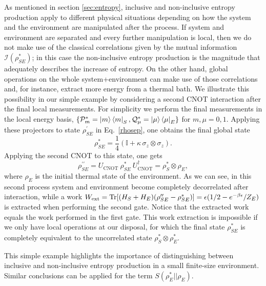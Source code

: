 \documentclass[aps,prx,twocolumn,showpacs,floatfix,superscriptaddress,graphics,longbibliography]{revtex4-1}
\newcommand{\tr}{\mathrm{Tr}}
\begin{document}
As mentioned in section \ref{sec:entropy}, inclusive and non-inclusive entropy production apply to different physical situations depending on how the system and the environment are manipulated after the process. If system and environment are separated and every further manipulation is local, then  we do not make use of the classical correlations given by the mutual information  $\mathcal{I}(\rho_{SE}^\ast)$; in this case the non-inclusive entropy production is the magnitude that adequately describes the increase of entropy. On the other hand,  global operations on the whole system+environment can make use of those correlations and, for instance, extract more energy from a thermal bath. We illustrate this possibility in our simple example by considering a second CNOT interaction after the final local measurements. For simplicity we perform the final measurements in the local energy basis, 
$\{ \mathcal{P}_m^\ast = \ket{m}\bra{m}_S, \mathcal{Q}_\mu^\ast = \ket{\mu}\bra{\mu}_E\}$ for $m,\mu = 0,1$. Applying these projectors to state $\rho_{SE}^\prime$ in Eq.~\eqref{rhosep}, one obtains the final global state
\begin{equation}
 \rho_{SE}^\ast = \frac{1}{4}\left(\mathbb{I} + \kappa\, \sigma_z \otimes \sigma_z\right).
\end{equation}
Applying the second CNOT to this state, one gets 
\begin{equation} \label{primeprime}
\rho_{SE}^{\prime \prime} = U_\mathrm{CNOT} ~\rho_{SE}^\ast~ U_\mathrm{CNOT}^\dagger = \rho_S^\ast \otimes \rho_E,
\end{equation}
where $\rho_E$ is the initial thermal state of the environment. As we can see, in this second process system and environment become completely 
decorrelated after interaction, while a work $W_{\rm ext}=\tr[(H_S + H_E)( \rho_{SE}^{\prime\prime} - \rho_{SE}^\ast)] =  \epsilon (1/2 - e^{-\beta \epsilon}/Z_E)$ is extracted when performing the second gate. Notice that the extracted work equals the work performed in the first gate. This work extraction is impossible if we only have local operations at our disposal, for which the final state $\rho^\ast_{SE}$ is completely equivalent to the uncorrelated state $\rho_S^\ast \otimes \rho_E^\ast$. 

This simple example highlights the importance of distinguishing between inclusive and non-inclusive entropy production in a small finite-size environment. 
Similar conclusions can be applied for the term $S(\rho_E^\ast || \rho_E)$.
\end{document}

